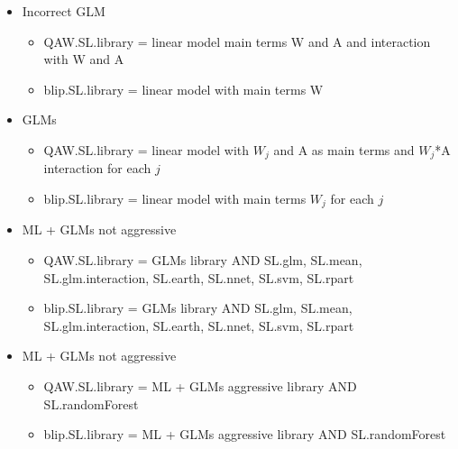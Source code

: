 \documentclass[11pt]{article}\usepackage[]{graphicx}\usepackage[]{color}
\begin{document}
\begin{itemize}
\item Incorrect GLM
\begin{itemize}
\item QAW.SL.library = linear model main terms W and A and interaction with W and A
\item blip.SL.library = linear model with main terms W
\end{itemize}
\item GLMs
\begin{itemize}
\item QAW.SL.library = linear model with $W_j$ and A as main terms and $W_j$*A interaction for each $j$
\item blip.SL.library = linear model with main terms $W_j$ for each $j$
\end{itemize}
\item ML + GLMs not aggressive
\begin{itemize}
\item QAW.SL.library = GLMs library AND SL.glm, SL.mean, SL.glm.interaction, SL.earth, SL.nnet, SL.svm, SL.rpart
\item blip.SL.library = GLMs library AND SL.glm, SL.mean, SL.glm.interaction, SL.earth, SL.nnet, SL.svm, SL.rpart
\end{itemize}
\item ML + GLMs not aggressive
\begin{itemize}
\item QAW.SL.library = ML + GLMs aggressive library AND SL.randomForest
\item blip.SL.library = ML + GLMs aggressive library AND SL.randomForest
\end{itemize}
\end{itemize}
\end{document}
